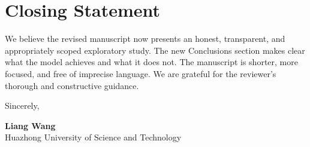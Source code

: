 \documentclass[11pt]{article}
\begin{document}
\section*{Closing Statement}

We believe the revised manuscript now presents an honest, transparent, and appropriately scoped exploratory study. The new Conclusions section makes clear what the model achieves and what it does not. The manuscript is shorter, more focused, and free of imprecise language. We are grateful for the reviewer's thorough and constructive guidance.

\vspace{0.5cm}
\noindent Sincerely,

\noindent \textbf{Liang Wang}\\
Huazhong University of Science and Technology
\end{document}
